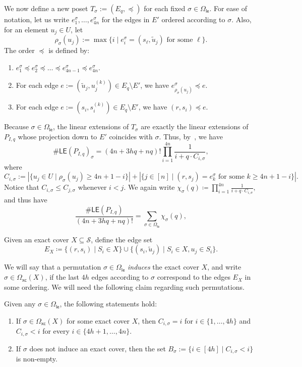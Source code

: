 \documentclass[11pt]{amsart}
\newcommand{\ns}{s}
\newcommand{\nou}{\tilde{u}}
\newcommand{\omxc}{\Omega_{\mathsf{xc}}}
\newcommand{\omle}{\Omega_{\mathsf{le}}}
\begin{document}
We now define a new poset $T_{\sigma} := (E_q, \preceq)$ for each fixed $\sigma \in \omle$. For ease of notation, let us write $e_1^\sigma, \dots, e_{4n}^\sigma$ for the edges in $E'$ ordered according to $\sigma$. Also, for an element $u_j \in U$, let \[
\rho_{\sigma}(u_j) := \max \{ i \mid e_{i}^\sigma = (\ns_\ell, \nou_j) \text{ for some } \ell \}.
\]
The order $\preceq$ is defined by:
\begin{enumerate}
    \item $e_1^\sigma \preceq e_2^\sigma \preceq \dots  \preceq e_{4n-1}^\sigma \preceq e_{4n}^\sigma$.
    \item For each edge $e := (\nou_j, u_j^{(k)}) \in E_q \setminus E'$, we have $e_{\rho_\sigma(u_j)}^\sigma \preceq e$.
    \item For each edge $e := (\ns_i, \ns_i^{(k)}) \in E_q \setminus E'$, we have $(r, \ns_i) \preceq e$.
\end{enumerate}
Because $\sigma \in \omle$, the linear extensions of $T_\sigma$ are exactly the linear extensions of $P_{I, q}$ whose projection down to $E'$ coincides with $\sigma$. Thus, by~, we have
\[
\#\mathsf{LE}(P_{I, q})_{\sigma} = (4n+3hq+nq)! \prod_{i=1}^{4n}\frac{1}{i + q \cdot C_{i, \sigma}},
\]
where 
\[ 
C_{i, \sigma} := |\{ u_j \in U \mid \rho_{\sigma}(u_j) \geq 4n + 1 -i \}| + |\{j \in [n] \mid (r, \ns_j) = e_k^\sigma \text{ for some } k \geq 4n+1-i\}| .
\]
Notice that $C_{i, \sigma} \leq C_{j, \sigma}$ whenever $i < j$. 
We again write 
\(
\chi_{\sigma}(q) \coloneqq \prod_{i=1}^{4n}\frac{1}{i + q \cdot C_{i, \sigma}},
\)
and thus have
\[
\frac{\#\mathsf{LE}(P_{I, q})}{(4n+3hq + nq)!} = \sum_{\sigma \in \omle} \chi_{\sigma}(q),
\]

Given an exact cover $X \subseteq \mathcal{S}$, define the edge set
$$E_X \coloneqq \{(r, \ns_i) \mid  S_i \in X\} \cup \{(\ns_i, \nou_j) \mid  S_i \in X, u_j \in S_i\}.$$

We will say that a permutation $\sigma \in \omle$ \emph{induces} the exact cover $X$, and write $\sigma \in \omxc(X)$, if the last $4h$ edges according to $\sigma$ correspond to the edges $E_X$ in some ordering. We will need the following claim regarding such permutations.

\begin{claim}\label{claim:le_cover_characterization}
Given any $\sigma \in \omle$, the following statements hold:
\begin{enumerate}
\item If $\sigma \in \omxc(X)$ for some exact cover $X$, then $C_{i, \sigma} = i$ for $i \in \{1, \dots, 4h\}$ and $C_{i, \sigma} < i$ for every $i \in \{4h+1, \dots, 4n\}$.
\item If $\sigma$ does not induce an exact cover, then the set $B_\sigma := \{ i \in [4h] \mid C_{i, \sigma} < i \}$ is non-empty.
\end{enumerate}
\end{claim}
\end{document}

